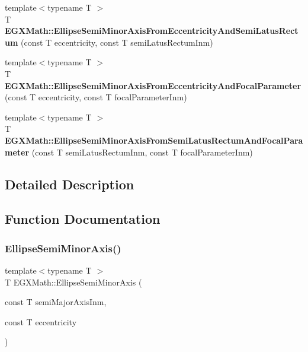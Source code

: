 \begin{DoxyCompactItemize}
\item 
\mbox{\label{group___e_g_x_math-_geometry-2_d-_ellipse-_semi_minor_axis_ga1194f5481c66c492147a27b9e167df4f}} 
{\footnotesize template$<$typename T $>$ }\\T {\bfseries E\+G\+X\+Math\+::\+Ellipse\+Semi\+Minor\+Axis\+From\+Eccentricity\+And\+Semi\+Latus\+Rectum} (const T eccentricity, const T semi\+Latus\+Rectum\+Inm)
\item 
\mbox{\label{group___e_g_x_math-_geometry-2_d-_ellipse-_semi_minor_axis_ga7bfc286b245acfcfd6c6bce85d25cdbb}} 
{\footnotesize template$<$typename T $>$ }\\T {\bfseries E\+G\+X\+Math\+::\+Ellipse\+Semi\+Minor\+Axis\+From\+Eccentricity\+And\+Focal\+Parameter} (const T eccentricity, const T focal\+Parameter\+Inm)
\item 
\mbox{\label{group___e_g_x_math-_geometry-2_d-_ellipse-_semi_minor_axis_gafe27ed64ba521ec3cf8557520cbc6a14}} 
{\footnotesize template$<$typename T $>$ }\\T {\bfseries E\+G\+X\+Math\+::\+Ellipse\+Semi\+Minor\+Axis\+From\+Semi\+Latus\+Rectum\+And\+Focal\+Parameter} (const T semi\+Latus\+Rectum\+Inm, const T focal\+Parameter\+Inm)
\end{DoxyCompactItemize}


\subsection{Detailed Description}


\subsection{Function Documentation}
\mbox{\label{group___e_g_x_math-_geometry-2_d-_ellipse-_semi_minor_axis_gae461acf3333565d69527dd86e9aa2b32}} 
\subsubsection{\texorpdfstring{Ellipse\+Semi\+Minor\+Axis()}{EllipseSemiMinorAxis()}}
{\footnotesize\ttfamily template$<$typename T $>$ \\
T E\+G\+X\+Math\+::\+Ellipse\+Semi\+Minor\+Axis (\begin{DoxyParamCaption}\item[{const T}]{semi\+Major\+Axis\+Inm,  }\item[{const T}]{eccentricity }\end{DoxyParamCaption})}



